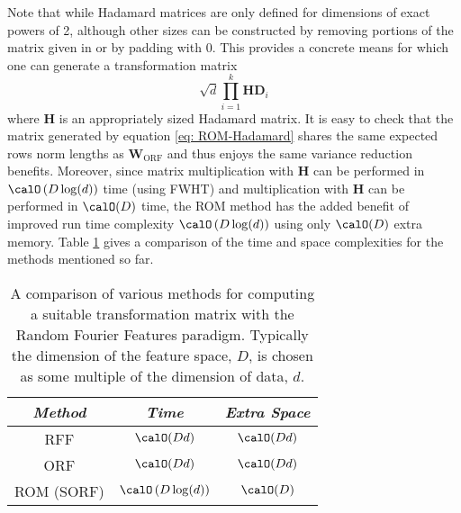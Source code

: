 Note that while Hadamard matrices are only defined for dimensions of exact powers of 2, although other sizes can be constructed by removing portions of the matrix given in  or by padding with $0$. This provides a concrete means for which one can generate a transformation matrix
\begin{equation} \label{eq: ROM-Hadamard}
    \sqrt{d} \prod_{i=1}^{k} \bm{H} \bm{D}_{i}
\end{equation}
where $\bm{H}$ is an appropriately sized Hadamard matrix. It is easy to check that the matrix generated by equation \ref{eq: ROM-Hadamard} shares the same expected rows norm lengths as $\bm{W}_{\text{ORF}}$ and thus enjoys the same variance reduction benefits. Moreover, since matrix multiplication with $\bm{H}$ can be performed in $\calO \left( D \log (d) \right)$ time (using FWHT) and multiplication with $\bm{H}$ can be performed in $\calO (D)$ time, the ROM method has the added benefit of improved run time complexity $\calO \left( D \log (d) \right)$ using only $\calO (D)$ extra memory. Table \ref{table: RFF-compare} gives a comparison of the time and space complexities for the methods mentioned so far.

\begin{table}[h!]
    \centering
    \caption{A comparison of various methods for computing a suitable transformation matrix with the Random Fourier Features paradigm. Typically the dimension of the feature space, $D$, is chosen as some multiple of the dimension of data, $d$.}
    \label{table: RFF-compare}
    \begin{tabular}{*3c}                                                                                                                    \\\bottomrule
        \hline
        \emph{Method}                                                  & \emph{Time}                       & \emph{Extra Space } \\\midrule
        RFF \cite{NIPS2007_013a006f}                                   & $\calO (Dd)$                      & $\calO (Dd)$        \\
        ORF \cite{YuFelixX2016ORF}                                     & $\calO (Dd)$                      & $\calO (Dd)$        \\
        ROM (SORF) \cite{ChoromanskiKrzysztof2017TUEo,YuFelixX2016ORF} & $\calO \left( D \log (d) \right)$ & $\calO (D)$         \\\bottomrule
        \hline
    \end{tabular}
\end{table}

